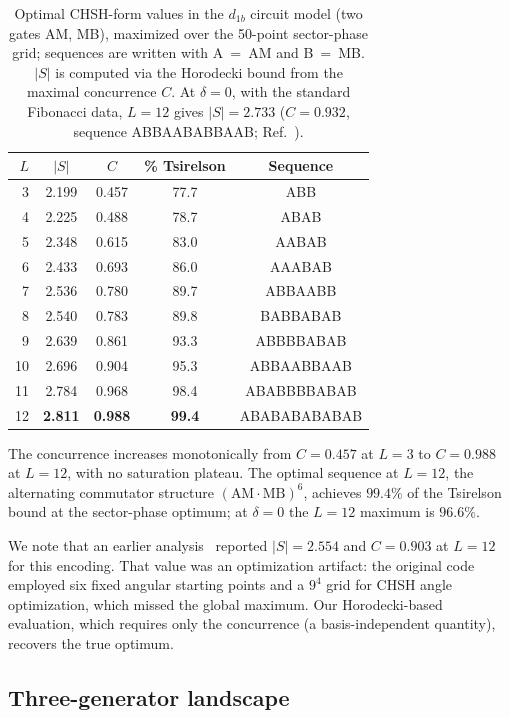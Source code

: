 \documentclass[aps,pra,twocolumn,superscriptaddress,longbibliography,floatfix,nofootinbib]{revtex4-2}
\begin{document}
\begin{table}[!htb]
\caption{%
Optimal CHSH-form values in the $d_{1b}$ circuit model (two gates AM,
MB), maximized over the 50-point sector-phase grid; sequences are
written with A~=~AM and B~=~MB. $|S|$ is computed via the Horodecki
bound from the maximal concurrence $C$. At $\delta = 0$, with the
standard Fibonacci data, $L = 12$ gives $|S| = 2.733$ ($C = 0.932$,
sequence ABBAABABBAAB; Ref.~\cite{Sayim2026topological}).
}
\label{tab:d1b}
\begin{ruledtabular}
\begin{tabular}{rcccc}
$L$ & $|S|$ & $C$ & \% Tsirelson & Sequence \\
\hline
 3 & 2.199 & 0.457 & 77.7 & ABB \\
 4 & 2.225 & 0.488 & 78.7 & ABAB \\
 5 & 2.348 & 0.615 & 83.0 & AABAB \\
 6 & 2.433 & 0.693 & 86.0 & AAABAB \\
 7 & 2.536 & 0.780 & 89.7 & ABBAABB \\
 8 & 2.540 & 0.783 & 89.8 & BABBABAB \\
 9 & 2.639 & 0.861 & 93.3 & ABBBBABAB \\
10 & 2.696 & 0.904 & 95.3 & ABBAABBAAB \\
11 & 2.784 & 0.968 & 98.4 & ABABBBBABAB \\
12 & \textbf{2.811} & \textbf{0.988} & \textbf{99.4} & ABABABABABAB \\
\end{tabular}
\end{ruledtabular}
\end{table}

The concurrence increases monotonically from $C=0.457$ at $L=3$ to
$C=0.988$ at $L=12$, with no saturation plateau.
The optimal sequence at $L=12$, the alternating commutator structure
$(\text{AM}\cdot\text{MB})^6$, achieves $99.4\%$ of the Tsirelson bound
at the sector-phase optimum; at $\delta = 0$ the $L = 12$ maximum is
$96.6\%$.

We note that an earlier analysis~\cite{Sayim2026topological} reported
$|S|=2.554$ and $C=0.903$ at $L=12$ for this encoding.
That value was an optimization artifact: the original code
employed six fixed angular starting points and a $9^4$ grid
for CHSH angle optimization, which missed the global maximum.
Our Horodecki-based evaluation, which requires only the
concurrence (a basis-independent quantity), recovers the
true optimum.

\subsection{Three-generator landscape}
\end{document}
